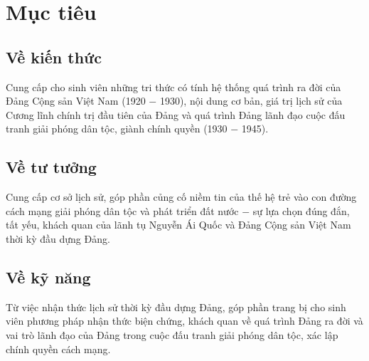 \section*{Mục tiêu}
\subsection*{Về kiến thức}
Cung cấp cho sinh viên những tri thức có tính hệ thống quá trình ra đời của Đảng Cộng sản Việt Nam (1920 $-$ 1930), nội dung cơ bản, giá trị lịch sử của Cương lĩnh chính trị đầu tiên của Đảng và quá trình Đảng lãnh đạo cuộc đấu tranh giải phóng dân tộc, giành chính quyền (1930 $-$ 1945).

\subsection*{Về tư tưởng}
Cung cấp cơ sở lịch sử, góp phần củng cố niềm tin của thế hệ trẻ vào con đường cách mạng giải phóng dân tộc và phát triển đất nước $-$ sự lựa chọn đúng đắn, tất yếu, khách quan của lãnh tụ Nguyễn Ái Quốc và Đảng Cộng sản Việt Nam thời kỳ đầu dựng Đảng.

\subsection*{Về kỹ năng}
Từ việc nhận thức lịch sử thời kỳ đầu dựng Đảng, góp phần trang bị cho sinh viên phương pháp nhận thức biện chứng, khách quan về quá trình Đảng ra đời và vai trò lãnh đạo của Đảng trong cuộc đấu tranh giải phóng dân tộc, xác lập chính quyền cách mạng.